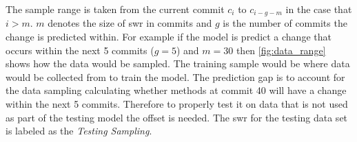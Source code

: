 





The sample range is taken from the current commit $c_i$ to $c_{i-g-m}$ in the case that $i > m$. $m$ denotes the size of \gls{swr} in commits and $g$ is the number of commits the change is predicted within. For example if the model is predict a change that occurs within the next 5 commits ($g = 5$) and $m = 30$ then \autoref{fig:data_range} shows how the data would be sampled. The training sample would be where data would be collected from to train the model. The prediction gap is to account for the data sampling calculating whether methods at commit 40 will have a change within the next 5 commits. Therefore to properly test it on data that is not used as part of the testing model the offset is needed. The \gls{swr} for the testing data set is labeled as the \textit{Testing Sampling}.

